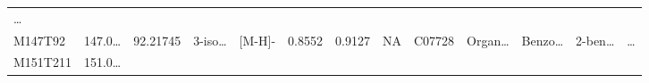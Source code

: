 \documentclass[
]{article}
\begin{document}
\begin{longtable}[]{@{}lllllllllllll@{}}
\begin{minipage}[t]{0.02\columnwidth}
\ldots{}\strut
\end{minipage}\tabularnewline
\begin{minipage}[t]{0.05\columnwidth}\raggedright
M147T92\strut
\end{minipage} & \begin{minipage}[t]{0.05\columnwidth}\raggedright
147.0\ldots{}\strut
\end{minipage} & \begin{minipage}[t]{0.05\columnwidth}\raggedright
92.21745\strut
\end{minipage} & \begin{minipage}[t]{0.05\columnwidth}\raggedright
3-iso\ldots{}\strut
\end{minipage} & \begin{minipage}[t]{0.05\columnwidth}\raggedright
{[}M-H{]}-\strut
\end{minipage} & \begin{minipage}[t]{0.07\columnwidth}\raggedright
0.8552\strut
\end{minipage} & \begin{minipage}[t]{0.07\columnwidth}\raggedright
0.9127\strut
\end{minipage} & \begin{minipage}[t]{0.05\columnwidth}\raggedright
NA\strut
\end{minipage} & \begin{minipage}[t]{0.04\columnwidth}\raggedright
C07728\strut
\end{minipage} & \begin{minipage}[t]{0.05\columnwidth}\raggedright
Organ\ldots{}\strut
\end{minipage} & \begin{minipage}[t]{0.05\columnwidth}\raggedright
Benzo\ldots{}\strut
\end{minipage} & \begin{minipage}[t]{0.05\columnwidth}\raggedright
2-ben\ldots{}\strut
\end{minipage} & \begin{minipage}[t]{0.02\columnwidth}\raggedright
\ldots{}\strut
\end{minipage}\tabularnewline
\begin{minipage}[t]{0.05\columnwidth}\raggedright
M151T211\strut
\end{minipage} & \begin{minipage}[t]{0.05\columnwidth}\raggedright
151.0\ldots{}\strut
\end{minipage} & \begin{minipage}[t]{0.05\columnwidth}\raggedright

\end{minipage}
\end{longtable}
\end{document}
